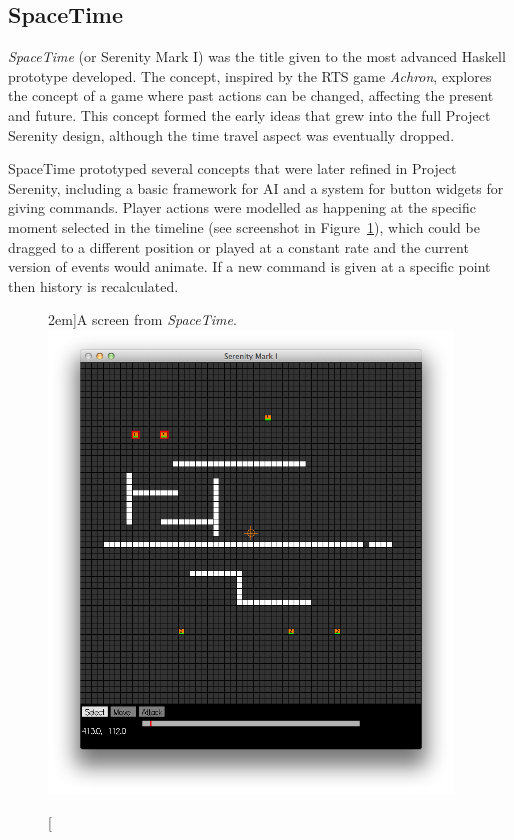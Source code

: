 \subsection{SpaceTime}
\label{ssec:spacetime}

\emph{SpaceTime} (or Serenity Mark I) was the title given to the most advanced Haskell prototype developed. The concept, inspired by the RTS game \emph{Achron}, explores the concept of a game where past actions can be changed, affecting the present and future. This concept formed the early ideas that grew into the full Project Serenity design, although the time travel aspect was eventually dropped.

SpaceTime prototyped several concepts that were later refined in Project Serenity, including a basic framework for AI and a system for button widgets for giving commands. Player actions were modelled as happening at the specific moment selected in the timeline (see screenshot in Figure~\ref{fig:spacetimescreen}), which could be dragged to a different position or played at a constant rate and the current version of events would animate. If a new command is given at a specific point then history is recalculated.

\begin{figure}
	\caption[A screen from \emph{SpaceTime}][2em]{A screen from \emph{SpaceTime}.}
	\includegraphics[width=29em]{res/spacetime/spacetimescreen.png}
	\label{fig:spacetimescreen}
\end{figure}

